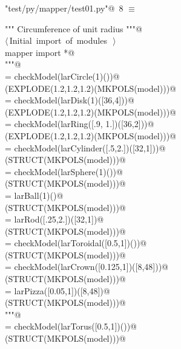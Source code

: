 \documentclass[11pt,oneside]{article}	%
\begin{document}
\begin{flushleft} \small \label{scrap18}
\protect{}\verb@"test/py/mapper/test01.py"@\nobreak\ {\footnotesize 8 }$\equiv$
\vspace{-1ex}
\begin{list}{}{} \item
\mbox{}\verb@""" Circumference of unit radius """@\\
\mbox{}\verb@@\hbox{$\langle\,$Initial import of modules\nobreak\ {\footnotesize {}}$\,\rangle$}\verb@@\\
\mbox{}\verb@from mapper import *@\\
\mbox{}\verb@"""@\\
\mbox{}\verb@model = checkModel(larCircle(1)())@\\
\mbox{}\verb@VIEW(EXPLODE(1.2,1.2,1.2)(MKPOLS(model)))@\\
\mbox{}\verb@model = checkModel(larDisk(1)([36,4]))@\\
\mbox{}\verb@VIEW(EXPLODE(1.2,1.2,1.2)(MKPOLS(model)))@\\
\mbox{}\verb@model = checkModel(larRing([.9, 1.])([36,2]))@\\
\mbox{}\verb@VIEW(EXPLODE(1.2,1.2,1.2)(MKPOLS(model)))@\\
\mbox{}\verb@model = checkModel(larCylinder([.5,2.])([32,1]))@\\
\mbox{}\verb@VIEW(STRUCT(MKPOLS(model)))@\\
\mbox{}\verb@model = checkModel(larSphere(1)())@\\
\mbox{}\verb@VIEW(STRUCT(MKPOLS(model)))@\\
\mbox{}\verb@model = larBall(1)()@\\
\mbox{}\verb@VIEW(STRUCT(MKPOLS(model)))@\\
\mbox{}\verb@model = larRod([.25,2.])([32,1])@\\
\mbox{}\verb@VIEW(STRUCT(MKPOLS(model)))@\\
\mbox{}\verb@model = checkModel(larToroidal([0.5,1])())@\\
\mbox{}\verb@VIEW(STRUCT(MKPOLS(model)))@\\
\mbox{}\verb@model = checkModel(larCrown([0.125,1])([8,48]))@\\
\mbox{}\verb@VIEW(STRUCT(MKPOLS(model)))@\\
\mbox{}\verb@model = larPizza([0.05,1])([8,48])@\\
\mbox{}\verb@VIEW(STRUCT(MKPOLS(model)))@\\
\mbox{}\verb@"""@\\
\mbox{}\verb@model = checkModel(larTorus([0.5,1])())@\\
\mbox{}\verb@VIEW(STRUCT(MKPOLS(model)))@\\
\mbox{}\verb@@{\NWsep}
\end{list}
\vspace{-2ex}
\end{flushleft}
\end{document}
